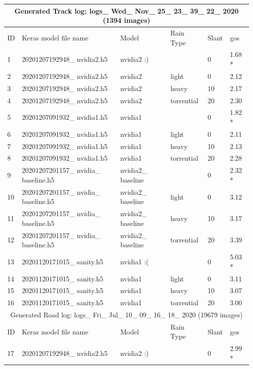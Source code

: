 \begin{table}[]
\begin{center}
\begin{tabular}{|l|l|l|l|l|l|}
\multicolumn{6}{|c|}{Generated Track log: logs\_ Wed\_ Nov\_ 25\_ 23\_ 39\_ 22\_ 2020 (1394 images)} \\ \hline
ID & Keras model file name & Model & Rain Type & Slant & gos \\ \hline
1 & 20201207192948\_ nvidia2.h5 & nvidia2 :) &  & 0 & 1.68 * \\ \hline
2 & 20201207192948\_ nvidia2.h5 & nvidia2 & light & 0 & 2.12 \\ \hline
3 & 20201207192948\_ nvidia2.h5 & nvidia2 & heavy & 10 & 2.17 \\ \hline
4 & 20201207192948\_ nvidia2.h5 & nvidia2 & torrential & 20 & 2.30 \\ \hline
5 & 20201207091932\_ nvidia1.h5 & nvidia1 &  & 0 & 1.82 * \\ \hline
6 & 20201207091932\_ nvidia1.h5 & nvidia1 & light & 0 & 2.11 \\ \hline
7 & 20201207091932\_ nvidia1.h5 & nvidia1 & heavy & 10 & 2.13 \\ \hline
8 & 20201207091932\_ nvidia1.h5 & nvidia1 & torrential & 20 & 2.28 \\ \hline
9 & 20201207201157\_ nvidia\_ baseline.h5 & nvidia2\_ baseline &  & 0 & 2.32 * \\ \hline
10 & 20201207201157\_ nvidia\_ baseline.h5 & nvidia2\_ baseline & light & 0 & 3.12 \\ \hline
11 & 20201207201157\_ nvidia\_ baseline.h5 & nvidia2\_ baseline & heavy & 10 & 3.17 \\ \hline
12 & 20201207201157\_ nvidia\_ baseline.h5 & nvidia2\_ baseline & torrential & 20 & 3.39 \\ \hline
13 & 20201120171015\_ sanity.h5 & nvidia1 :( &  & 0 & 5.03 * \\ \hline
14 & 20201120171015\_ sanity.h5 & nvidia1 & light & 0 & 3.11 \\ \hline
15 & 20201120171015\_ sanity.h5 & nvidia1 & heavy & 10 & 3.07 \\ \hline
16 & 20201120171015\_ sanity.h5 & nvidia1 & torrential & 20 & 3.00 \\ \hline
\multicolumn{6}{|c|}{Generated Road log:  logs\_ Fri\_ Jul\_ 10\_ 09\_ 16\_ 18\_ 2020 (19679 images)} \\ \hline
ID & Keras model file name & Model & Rain Type & Slant & gos \\ \hline
17 & 20201207192948\_ nvidia2.h5 & nvidia2 :) &  & 0 & 2.99 * \\ \hline  %

\end{tabular}
\end{center}
\end{table}
